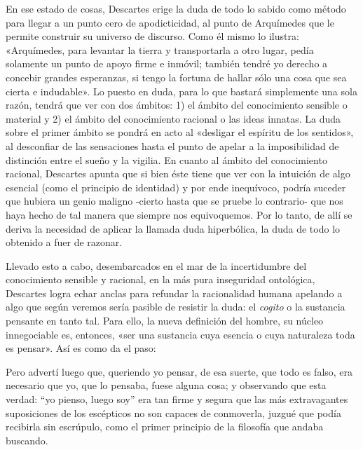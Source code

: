 En ese estado de cosas, Descartes erige la duda de todo lo sabido como método para llegar a un punto cero de apodicticidad, al punto de Arquímedes que le permite construir su universo de discurso. Como él mismo lo ilustra: «Arquímedes, para levantar la tierra y transportarla a otro lugar, pedía solamente un punto de apoyo firme e inmóvil; también tendré yo derecho a concebir grandes esperanzas, si tengo la fortuna de hallar sólo una cosa que sea cierta e indudable». Lo puesto en duda, para lo que bastará simplemente una sola razón, tendrá que ver con dos ámbitos: 1) el ámbito del conocimiento sensible o material y 2) el ámbito del conocimiento racional o las ideas innatas. La duda sobre el primer ámbito se pondrá en acto al «desligar el espíritu de los sentidos», al desconfiar de las sensaciones hasta el punto de apelar a la imposibilidad de distinción entre el sueño y la vigilia. En cuanto al ámbito del conocimiento racional, Descartes apunta que si bien éste tiene que ver con la intuición de algo esencial (como el principio de identidad) y por ende inequívoco, podría suceder que hubiera un genio maligno -cierto hasta que se pruebe lo contrario- que nos haya hecho de tal manera que siempre nos equivoquemos. Por lo tanto, de allí se deriva la necesidad de aplicar la llamada duda hiperbólica, la duda de todo lo obtenido a fuer de razonar.

Llevado esto a cabo, desembarcados en el mar de la incertidumbre del conocimiento sensible y racional, en la más pura inseguridad ontológica, Descartes logra echar anclas para refundar la racionalidad humana apelando a algo que según veremos sería pasible de resistir la duda: el \emph{cogito} o la sustancia pensante en tanto tal. Para ello, la nueva definición del hombre, su núcleo innegociable es, entonces, «ser una sustancia cuya esencia o cuya naturaleza toda es pensar». Así es como da el paso:

Pero advertí luego que, queriendo yo pensar, de esa suerte, que todo es falso, era necesario que yo, que lo pensaba, fuese alguna cosa; y observando que esta verdad: ``yo pienso, luego soy'' era tan firme y segura que las más extravagantes suposiciones de los escépticos no son capaces de conmoverla, juzgué que podía recibirla sin escrúpulo, como el primer principio de la filosofía que andaba buscando.

